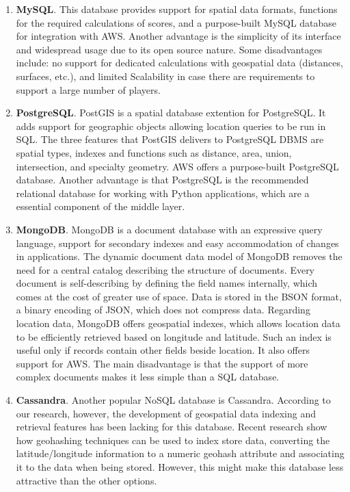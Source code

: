 \documentclass[conference]{IEEEtran}
\begin{document}
\begin{enumerate}

\item \textbf{MySQL}. This database provides support for spatial data formats, functions for the required calculations of scores, and a purpose-built MySQL database for integration with AWS. Another advantage is the simplicity of its interface and widespread usage due to its open source nature. Some disadvantages include: no support for dedicated calculations with geospatial data (distances, surfaces, etc.), and limited Scalability in case there are requirements to support a large number of players. 

\item \textbf{PostgreSQL}. PostGIS is a spatial database extention for PostgreSQL. It adds support for geographic objects allowing location queries to be run in SQL. The three features that PostGIS delivers to PostgreSQL DBMS are spatial types, indexes and functions such as distance, area, union, intersection, and specialty geometry. AWS offers a purpose-built PostgreSQL database. Another advantage is that PostgreSQL is the recommended relational database for working with Python applications, which are a essential component of the middle layer.

\item \textbf{MongoDB}. MongoDB is a document database with an expressive query language, support for secondary indexes and easy accommodation of changes in applications. The dynamic document data model of MongoDB removes the need for a central catalog describing the structure of documents. Every document is self-describing by defining the field names internally, which comes at the cost of greater use of space. Data is stored in the BSON format, a binary encoding of JSON, which does not compress data. 
Regarding location data, MongoDB offers geospatial indexes, which allows location data to be efficiently retrieved based on longitude and latitude. Such an index is useful only if records contain other fields beside location. It also offers support for AWS. The main disadvantage is that the support of more complex documents makes it less simple than a SQL database. 
 
\item \textbf{Cassandra}. Another popular NoSQL database is Cassandra. According to our research, however, the development of geospatial data indexing and retrieval features has been lacking for this database.  Recent research show how geohashing techniques can be used to index store data, converting the latitude/longitude information to a numeric geohash attribute and associating it to the data when being stored. However, this might make this database less attractive than the other options. 

\end{enumerate}
\end{document}
